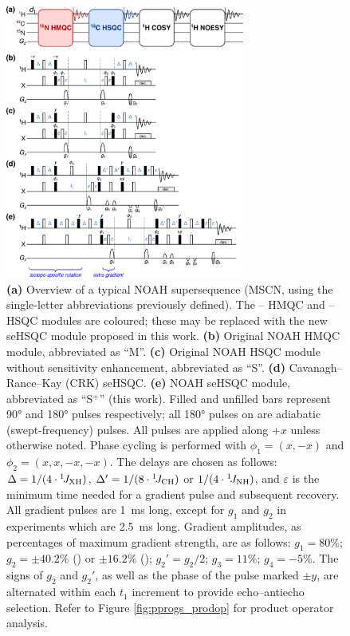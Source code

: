 \documentclass[11pt]{article}
\newcommand*{\noahSp}{S$^+$}
\newcommand*{\carbon}{\ce{^{13}C}}
\newcommand*{\proton}{\ce{^{1}H}}
\newcommand*{\nitrogen}{\ce{^{15}N}}
\newcommand*{\onejxh}{{}^{1}\!J_{\ce{XH}}}
\newcommand*{\onejch}{{}^{1}\!J_{\ce{CH}}}
\newcommand*{\onejnh}{{}^{1}\!J_{\ce{NH}}}
\newcommand*{\figref}[1]{Figure \ref{fig:#1}}
\begin{document}
\begin{figure}
    \centering
    \includegraphics[width=0.7\textwidth]{pprogs.png}
    \caption{
        \textbf{(a)} Overview of a typical NOAH supersequence (MSCN, using the single-letter abbreviations previously defined\autocite{Kupce2017ACIE}).
        The \nitrogen{}--\proton{} HMQC and \carbon{}--\proton{} HSQC modules are coloured; these may be replaced with the new seHSQC module proposed in this work.
        \textbf{(b)} Original NOAH HMQC module,\autocite{Kupce2017ACIE, Kupce2007MRC} abbreviated as ``M''.
        \textbf{(c)} Original NOAH HSQC module without sensitivity enhancement,\autocite{Kupce2017ACIE, Schulze-Sunninghausen2017JMR} abbreviated as ``S''.
        \textbf{(d)} Cavanagh--Rance--Kay (CRK) seHSQC.\autocite{sehsqc}
        \textbf{(e)} NOAH seHSQC module, abbreviated as ``\noahSp{}'' (this work).
        Filled and unfilled bars represent \ang{90} and \ang{180} pulses respectively; all \ang{180} pulses on \carbon{} are adiabatic (swept-frequency) pulses.
        All pulses are applied along $+x$ unless otherwise noted.
        Phase cycling is performed with $\phi_1 = (x, -x)$ and $\phi_2 = (x, x, -x, -x)$.
        The delays are chosen as follows: $\Delta = 1/(4\cdot\onejxh)$, $\Delta' = 1/(8\cdot\onejch)$ or $1/(4\cdot\onejnh)$, and $\varepsilon$ is the minimum time needed for a gradient pulse and subsequent recovery.
        All gradient pulses are \SI{1}{\ms} long, except for $g_1$ and $g_2$ in \nitrogen{} experiments which are \SI{2.5}{\ms} long.
        Gradient amplitudes, as percentages of maximum gradient strength, are as follows: $g_1 = 80\%$; $g_2 = \pm 40.2\%$ (\carbon{}) or $\pm 16.2\%$ (\nitrogen{}); ${g_2}' = g_2/2$; $g_3 = 11\%$; $g_4 = -5\%$.
        The signs of $g_2$ and ${g_2}'$, as well as the phase of the \carbon{} pulse marked $\pm y$, are alternated within each $t_1$ increment to provide echo--antiecho selection.
        Refer to \figref{pprogs_prodop} for product operator analysis.
    }
    \label{fig:pprogs}
\end{figure}
\end{document}
